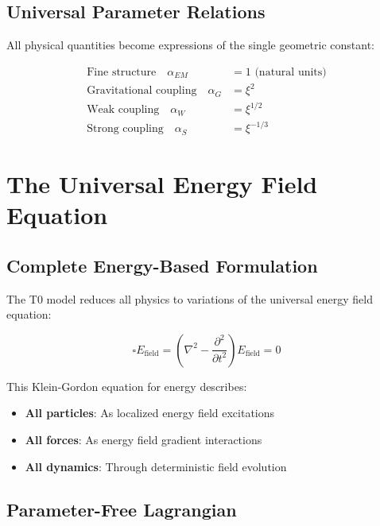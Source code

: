 \documentclass[12pt,a4paper]{report}
\begin{document}
\subsection{Universal Parameter Relations}
\label{subsec:universal_parameter_relations}

All physical quantities become expressions of the single geometric constant:

\begin{align}
	\text{Fine structure} \quad \alpha_{EM} &= 1 \text{ (natural units)} \\
	\text{Gravitational coupling} \quad \alpha_G &= \xi^2 \\
	\text{Weak coupling} \quad \alpha_W &= \xi^{1/2} \\
	\text{Strong coupling} \quad \alpha_S &= \xi^{-1/3}
\end{align}

\section{The Universal Energy Field Equation}
\label{sec:universal_energy_field_equation}

\subsection{Complete Energy-Based Formulation}
\label{subsec:complete_energy_formulation}

The T0 model reduces all physics to variations of the universal energy field equation:

\begin{equation}
	\boxed{\square E_{\text{field}} = \left(\nabla^2 - \frac{\partial^2}{\partial t^2}\right) E_{\text{field}} = 0}
	\label{eq:universal_field_equation}
\end{equation}

This Klein-Gordon equation for energy describes:
\begin{itemize}
	\item \textbf{All particles}: As localized energy field excitations
	\item \textbf{All forces}: As energy field gradient interactions
	\item \textbf{All dynamics}: Through deterministic field evolution
\end{itemize}

\subsection{Parameter-Free Lagrangian}
\label{subsec:parameter_free_lagrangian}
\end{document}
